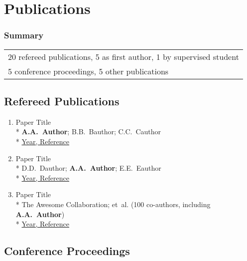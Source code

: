 \section{Publications}

\subsubsection{Summary}

\begin{tabular}{l}
    20 refereed publications, 5 as first author, 1 by supervised student \\
    5 conference proceedings, 5 other publications \\
\end{tabular}



\subsection{Refereed Publications}
\vspace{2mm}

\begin{enumerate}

\item
    Paper Title \\*
    \nopagebreak \textbf{A.A.~Author}; B.B.~Bauthor; C.C.~Cauthor \\*
    \nopagebreak \href{https://ui.adsabs.harvard.edu/#abs/....}{Year, Reference}

\item
    Paper Title \\*
    \nopagebreak D.D.~Dauthor; \textbf{A.A.~Author}; E.E.~Eauthor \\*
    \nopagebreak \href{https://ui.adsabs.harvard.edu/#abs/....}{Year, Reference}

\item
    Paper Title \\*
    \nopagebreak The Awesome Collaboration; et~al. (100 co-authors, including \textbf{A.A.~Author}) \\*
    \nopagebreak \href{https://ui.adsabs.harvard.edu/#abs/....}{Year, Reference}

\end{enumerate}



\subsection{Conference Proceedings}
\vspace{2mm}

